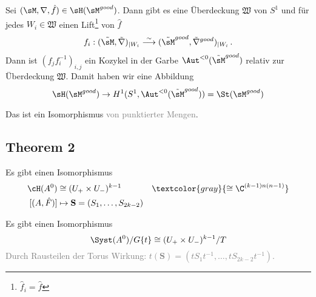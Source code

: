 Sei $(\sM,\nabla,\hat f)\in\sH(\sM^{good})$. Dann gibt es eine Überdeckung
$\mathfrak{W}$ von $S^1$ und für jedes $W_i\in\mathfrak{W}$ einen
Lift\footnote{$\hat f_i=\hat f$} von $\hat f$
\[
  f_i:(\tilde\sM,\tilde\nabla)_{|W_i}
  \overset{\sim}{\longrightarrow}
  (\tilde\sM^{good},\tilde\nabla^{good})_{|W_i} \,.
\]
Dann ist $(f_jf_i^{-1})_{i,j}$ ein Kozykel in der Garbe
$\Aut^{<0}(\tilde\sM^{good})$ relativ zur Überdeckung $\mathfrak{W}$.
Damit haben wir eine Abbildung
\[
  \sH(\sM^{good})\to H^1(S^1,\Aut^{<0}(\tilde\sM^{good}))=\St(\sM^{good})
\]
\begin{tthm}
  Das ist ein Isomorphismus \textcolor{gray}{von punktierter Mengen}.
\end{tthm}
\pagebreak \subsection{Theorem 2} %
\begin{tthm}
  Es gibt einen Isomorphismus
  \begin{align*}
    \cH(A^0)&\cong(U_+\times U_-)^{k-1}
    &\textcolor{gray}{\cong\C^{(k-1)n(n-1)}}
  \\ [(A,\hat F)]&\mapsto\textbf{S}=(S_1,\dots,S_{2k-2})
  \end{align*}
  \begin{cor}
    Es gibt einen Isomorphismus
    \[
      \Syst(A^0)/G\{t\}\cong(U_+\times U_-)^{k-1}/T
    \]
    \textcolor{gray}{Durch Rausteilen der Torus 
      Wirkung: $t(\textbf{S})=(tS_1t^{-1},\dots,tS_{2k-2}t^{-1})$.}
  \end{cor}
\end{tthm}

